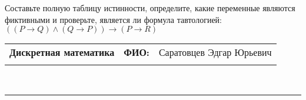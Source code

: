 \documentclass[10pt]{exam}
\newcommand{\class}{Дискретная математика}
\newcommand{\examdate}{}
\begin{document}
\begin{questions}
\begin{enumerate}[a)]
\end{enumerate}\question Составьте полную таблицу истинности, определите, какие переменные являются фиктивными и проверьте, является ли формула тавтологией:
$(( P \rightarrow Q) \land (Q \rightarrow P)) \rightarrow (P \rightarrow R)$

\end{questions}
\newpage
\begin{flushright}
\begin{tabular}{p{2.8in} r l}
\textbf{\class} & \textbf{ФИО:} &Саратовцев Эдгар Юрьевич
\\

\textbf{\examdate} &&\\
\end{tabular}\\
\end{flushright}
\rule[1ex]{\textwidth}{.1pt}
\end{document}
